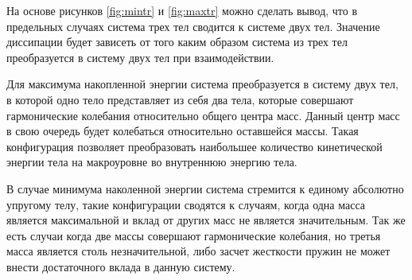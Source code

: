 На основе рисунков \ref{fig:mintr} и \ref{fig:maxtr} можно сделать вывод, что в предельных случаях система трех тел сводится к системе двух тел.
Значение диссипации будет зависеть от того каким образом система из трех тел преобразуется в систему двух тел при взаимодействии. 

Для максимума накопленной энергии система преобразуется в систему двух тел, в которой одно тело представляет из себя два тела, которые совершают гармонические колебания относительно общего
центра масс. Данный центр масс в свою очередь будет колебаться относительно оставшейся массы. Такая конфигурация позволяет преобразовать наибольшее количество
кинетической энергии тела на макроуровне во внутреннюю энергию тела.

В случае минимума наколенной энергии система стремится к единому абсолютно упругому телу, такие конфигурации сводятся к случаям, когда одна масса является
максимальной и вклад от других масс не является значительным. Так же есть случаи когда две массы совершают гармонические колебания, но третья масса является 
столь незначительной, либо засчет жесткости пружин не может внести достаточного вклада в данную систему. 
